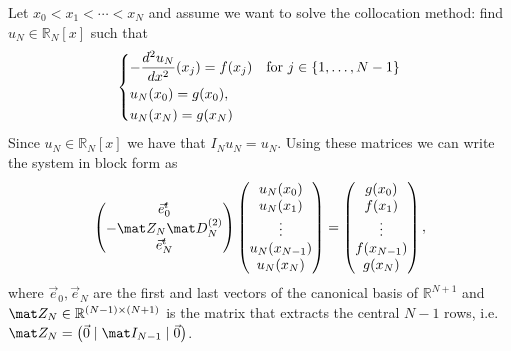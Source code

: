 \begin{example}
    Let $x_0 < x_1 < \cdots < x_N$ and assume we want to solve
    the collocation method: find $u_N \in \mathbb R_N[x]$ such that
    \begin{equation*}
        \begin{dcases}
            -\frac{d^2 u_N }{dx^2} (x_j) = f(x_j) & \text{for } j \in \{1, \dots, N-1\} \\
            u_N(x_0) = g(x_0),                                                           \\
            u_N (x_N) = g(x_N)
        \end{dcases}
    \end{equation*}
    Since $u_N \in \mathbb R_N[x]$ we have that $I_N u_N = u_N$.
    Using these matrices we can write the system in block form as
    \begin{equation*}
        \begin{pmatrix}
            \vec e_0^t                      \\
            -\mat Z_N \mat D_N^{(2)}     \\
            \vec e_N^t
        \end{pmatrix}
        \begin{pmatrix}
            u_N(x_0)      \\
            u_N (x_1)     \\
            \vdots      \\
            u_N (x_{N-1}) \\
            u_N(x_N)
        \end{pmatrix}
        = \begin{pmatrix}
            g(x_0)      \\
            f (x_1)     \\
            \vdots      \\
            f (x_{N-1}) \\
            g(x_N)
        \end{pmatrix},
    \end{equation*}
    where $\vec e_0, \vec e_N$ are the first and last vectors of the canonical basis of $\mathbb R^{N+1}$ and $\mat Z_N \in \mathbb R^{(N-1) \times (N+1)}$ is the matrix that extracts the central $N-1$ rows, i.e. $\mat Z_N = \big( \vec 0 \mid \mat I_{N-1} \mid \vec 0 \big)$.
\end{example}